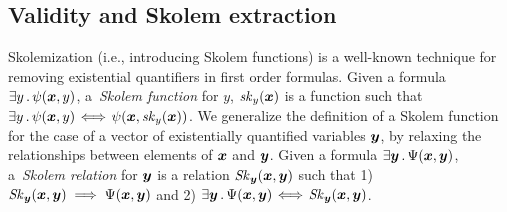 %





\subsection{Validity and Skolem extraction}
\label{sim:check}

\aevalalgorithm  

Skolemization (i.e., introducing Skolem functions) is a well-known
technique for removing existential quantifiers in first order formulas.
%
Given a formula ${ \exists y \such \psi(\vx, y)}$,
a~\emph{Skolem function} for $y$, $\mathit{sk}_{y}(\vx)$ is a function such that
$\exists y \such \psi(\vx,y)\!\iff\!\psi (\vx, \mathit{sk}_{y} (\vx))$.
We generalize the definition of a Skolem function for the case of a
vector of existentially quantified variables $\vy$, by relaxing the
relationships between elements of $\vx$ and $\vy$.
Given a formula ${\exists \vy \such \Psi(\vx, \vy)}$, a~\emph{Skolem relation} for $\vy$ is a relation ${\mathit{Sk}_{\vy} (\vx, \vy)}$ such that 1) $\mathit{Sk}_{\vy} (\vx, \vy) \implies \Psi (\vx, \vy)$ and 2) $\exists \vy \such \Psi(\vx, \vy)\!\iff\!\mathit{Sk}_{\vy} (\vx, \vy)$.
  

